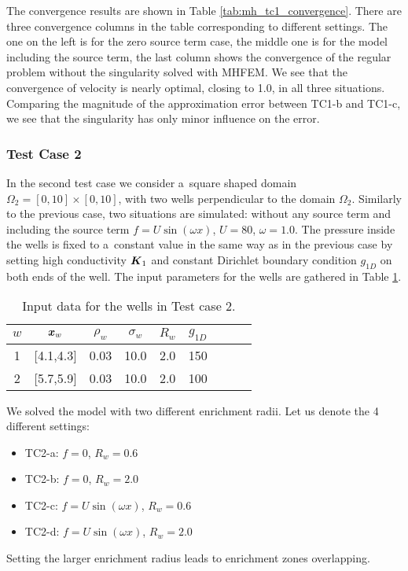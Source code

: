 The convergence results are shown in Table \ref{tab:mh_tc1_convergence}.
There are three convergence columns in the table corresponding to different settings.
The one on the left is for the zero source term case,
the middle one is for the model including the source term,
the last column shows the convergence of the regular problem without the singularity solved with MHFEM.
We see that the convergence of velocity is nearly optimal, closing to 1.0, in all three situations.
Comparing the magnitude of the approximation error between TC1-b and TC1-c,
we see that the singularity has only minor influence on the error.


\subsubsection{Test Case 2}
In the second test case we consider a~square shaped domain $\Omega_2=[0,10]\times[0,10]$,
with two wells perpendicular to the domain $\Omega_2$.
Similarly to the previous case, two situations are simulated: without any source term and
including the source term $f=U\sin(\omega x)$, $U=80$, $\omega=1.0$.
The pressure inside the wells is fixed to a~constant value in the same way as in the previous case 
by setting high conductivity $\mathbf{\boldsymbol{K}}_1$ and constant Dirichlet boundary condition $g_{1D}$ on both ends of the well.
The input parameters for the wells are gathered in Table \ref{tab:tc2_data}.
%
\begin{table}[!hb]
\begin{center}
\begin{tabular}{ccccccccc}
\toprule
$w$ & $\mathbf{\boldsymbol{x}}_w$  & $\rho_w$ & $\sigma_w$ & $R_w$ & $g_{1D}$\\
\midrule
1& [4.1,4.3] & 0.03 & 10.0 & 2.0 & 150 \\
2& [5.7,5.9] & 0.03 & 10.0 & 2.0 & 100 \\
\bottomrule
\end{tabular}
\caption{Input data for the wells in Test case 2.}
\label{tab:tc2_data}
\end{center}
\end{table}

We solved the model with two different enrichment radii. Let us denote the 4 different settings:
\begin{itemize}
    \item TC2-a: $f=0$, $R_w=0.6$
    \item TC2-b: $f=0$, $R_w=2.0$
    \item TC2-c: $f=U\sin(\omega x)$, $R_w=0.6$
    \item TC2-d: $f=U\sin(\omega x)$, $R_w=2.0$
\end{itemize}
Setting the larger enrichment radius leads to enrichment zones overlapping.

